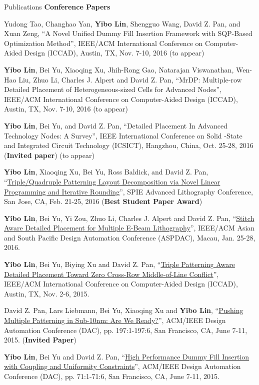 \begin{rSection}{Publications}
\textbf{Conference Papers}
\begin{description}[font=\normalfont]
\item[{[C8]}]{
    Yudong Tao, Changhao Yan, \textbf{Yibo Lin}, Shengguo Wang, David Z. Pan, and Xuan Zeng, 
    ``A Novel Unified Dummy Fill Insertion Framework with SQP-Based Optimization Method'', 
    IEEE/ACM International Conference on Computer-Aided Design (ICCAD), Austin, TX, Nov. 7-10, 2016
    (to appear)
}
\item[{[C7]}]{
    \textbf{Yibo Lin}, Bei Yu, Xiaoqing Xu, Jhih-Rong Gao, Natarajan Viswanathan, Wen-Hao Liu, Zhuo Li, Charles J. Alpert and David Z. Pan, 
    ``MrDP: Multiple-row Detailed Placement of Heterogeneous-sized Cells for Advanced Nodes'', 
    IEEE/ACM International Conference on Computer-Aided Design (ICCAD), Austin, TX, Nov. 7-10, 2016
    (to appear)
}
\item[{[C6]}]{
    \textbf{Yibo Lin}, Bei Yu, and David Z. Pan, 
   ``Detailed Placement In Advanced Technology Nodes: A Survey'', 
   IEEE International Conference on Solid -State and Integrated Circuit Technology (ICSICT), Hangzhou, China, Oct. 25-28, 2016
   (\textbf{Invited paper})
    (to appear)
}
\item[{[C5]}]{
    \textbf{Yibo Lin}, Xiaoqing Xu, Bei Yu, Ross Baldick, and David Z. Pan, 
 ``\href{proceedings.spiedigitallibrary.org/proceeding.aspx?articleid=2505329}{Triple/Quadruple Patterning Layout Decomposition via Novel Linear Programming and Iterative Rounding}'', 
    SPIE Advanced Lithography Conference, San Jose, CA, Feb. 21-25, 2016
    (\textbf{Best Student Paper Award})
}
\item[{[C4]}]{
 \textbf{Yibo Lin}, Bei Yu, Yi Zou, Zhuo Li, Charles J. Alpert and David Z. Pan, 
 ``\href{http://ieeexplore.ieee.org/xpl/articleDetails.jsp?arnumber=7428009}{Stitch Aware Detailed Placement for Multiple E-Beam Lithography}'', 
    IEEE/ACM Asian and South Pacific Design Automation Conference (ASPDAC), Macau, Jan. 25-28, 2016.
}
\item[{[C3]}]{
 \textbf{Yibo Lin}, Bei Yu, Biying Xu and David Z. Pan, 
 ``\href{http://dl.acm.org/citation.cfm?id=2840875}{Triple Patterning Aware Detailed Placement Toward Zero Cross-Row Middle-of-Line Conflict}'', 
    IEEE/ACM International Conference on Computer-Aided Design (ICCAD), Austin, TX, Nov. 2-6, 2015.
}
\item[{[C2]}]{
 David Z. Pan, Lars Liebmann, Bei Yu, Xiaoqing Xu and \textbf{Yibo Lin}, 
 ``\href{http://dl.acm.org/citation.cfm?id=2744769.2747940}{Pushing Multiple Patterning in Sub-10nm: Are We Ready?}'', 
    ACM/IEEE Design Automation Conference (DAC), pp. 197:1-197:6, San Francisco, CA, June 7-11, 2015. 
    (\textbf{Invited Paper})
}
\item[{[C1]}]{
 \textbf{Yibo Lin}, Bei Yu and David Z. Pan, 
 ``\href{http://dl.acm.org/citation.cfm?id=2744769.2744850}{High Performance Dummy Fill Insertion with Coupling and Uniformity Constraints}'',
    ACM/IEEE Design Automation Conference (DAC), pp. 71:1-71:6, San Francisco, CA, June 7-11, 2015. 
}
\end{description}


\end{rSection}

